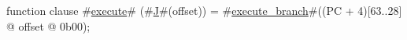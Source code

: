 function clause #\hyperref[zexecute]{execute}# (#\hyperref[zJ]{J}#(offset)) =
  {
    #\hyperref[zexecutezybranch]{execute\_branch}#((PC + 4)[63..28] @ offset @ 0b00);
  }
